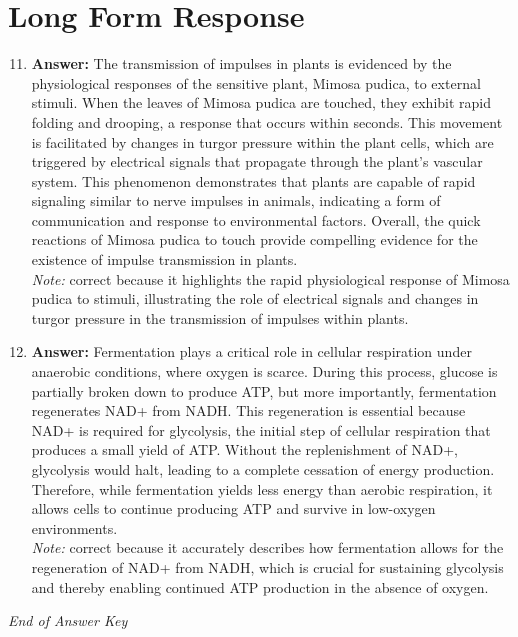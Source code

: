 \documentclass[12pt]{article}
\begin{document}
\section*{Long Form Response}
\begin{enumerate}[label=\arabic*.]
\setcounter{enumi}{10}
\item \textbf{Answer:} The transmission of impulses in plants is evidenced by the physiological responses of the sensitive plant, Mimosa pudica, to external stimuli. When the leaves of Mimosa pudica are touched, they exhibit rapid folding and drooping, a response that occurs within seconds. This movement is facilitated by changes in turgor pressure within the plant cells, which are triggered by electrical signals that propagate through the plant's vascular system. This phenomenon demonstrates that plants are capable of rapid signaling similar to nerve impulses in animals, indicating a form of communication and response to environmental factors. Overall, the quick reactions of Mimosa pudica to touch provide compelling evidence for the existence of impulse transmission in plants.
\\ \textit{Note:} correct because it highlights the rapid physiological response of Mimosa pudica to stimuli, illustrating the role of electrical signals and changes in turgor pressure in the transmission of impulses within plants.
\item \textbf{Answer:} Fermentation plays a critical role in cellular respiration under anaerobic conditions, where oxygen is scarce. During this process, glucose is partially broken down to produce ATP, but more importantly, fermentation regenerates NAD+ from NADH. This regeneration is essential because NAD+ is required for glycolysis, the initial step of cellular respiration that produces a small yield of ATP. Without the replenishment of NAD+, glycolysis would halt, leading to a complete cessation of energy production. Therefore, while fermentation yields less energy than aerobic respiration, it allows cells to continue producing ATP and survive in low-oxygen environments.
\\ \textit{Note:} correct because it accurately describes how fermentation allows for the regeneration of NAD+ from NADH, which is crucial for sustaining glycolysis and thereby enabling continued ATP production in the absence of oxygen.
\end{enumerate}

\vfill
\noindent\textit{End of Answer Key}
\end{document}
